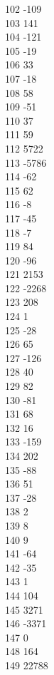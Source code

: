 { 102	-109 \\
 103	141 \\
 104	-121 \\
 105	-19 \\
 106	33 \\
 107	-18 \\
 108	58 \\
 109	-51 \\
 110	37 \\
 111	59 \\
 112	5722 \\
 113	-5786 \\
 114	-62 \\
 115	62 \\
 116	-8 \\
 117	-45 \\
 118	-7 \\
 119	84 \\
 120	-96 \\
 121	2153 \\
 122	-2268 \\
 123	208 \\
 124	1 \\
 125	-28 \\
 126	65 \\
 127	-126 \\
 128	40 \\
 129	82 \\
 130	-81 \\
 131	68 \\
 132	16 \\
 133	-159 \\
 134	202 \\
 135	-88 \\
 136	51 \\
 137	-28 \\
 138	2 \\
 139	8 \\
 140	9 \\
 141	-64 \\
 142	-35 \\
 143	1 \\
 144	104 \\
 145	3271 \\
 146	-3371 \\
 147	0 \\
 148	164 \\
 149	22788 \\
}
